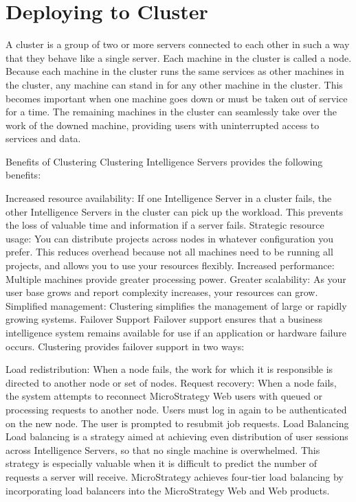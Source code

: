 \documentclass[12pt]{article}
\begin{document}

\newpage
\section{Deploying to Cluster}
A cluster is a group of two or more servers connected to each other in such a way that they behave like a single server. Each machine in the cluster is called a node. Because each machine in the cluster runs the same services as other machines in the cluster, any machine can stand in for any other machine in the cluster. This becomes important when one machine goes down or must be taken out of service for a time. The remaining machines in the cluster can seamlessly take over the work of the downed machine, providing users with uninterrupted access to services and data.

Benefits of Clustering
Clustering Intelligence Servers provides the following benefits:

Increased resource availability: If one Intelligence Server in a cluster fails, the other Intelligence Servers in the cluster can pick up the workload. This prevents the loss of valuable time and information if a server fails.
Strategic resource usage: You can distribute projects across nodes in whatever configuration you prefer. This reduces overhead because not all machines need to be running all projects, and allows you to use your resources flexibly.
Increased performance: Multiple machines provide greater processing power.
Greater scalability: As your user base grows and report complexity increases, your resources can grow.
Simplified management: Clustering simplifies the management of large or rapidly growing systems.
Failover Support
Failover support ensures that a business intelligence system remains available for use if an application or hardware failure occurs. Clustering provides failover support in two ways:

Load redistribution: When a node fails, the work for which it is responsible is directed to another node or set of nodes.
Request recovery: When a node fails, the system attempts to reconnect MicroStrategy Web users with queued or processing requests to another node. Users must log in again to be authenticated on the new node. The user is prompted to resubmit job requests.
Load Balancing
Load balancing is a strategy aimed at achieving even distribution of user sessions across Intelligence Servers, so that no single machine is overwhelmed. This strategy is especially valuable when it is difficult to predict the number of requests a server will receive. MicroStrategy achieves four-tier load balancing by incorporating load balancers into the MicroStrategy Web and Web products.
\end{document}
